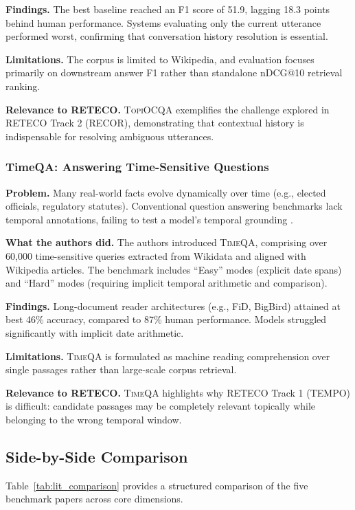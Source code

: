 \textbf{Findings.} The best baseline reached an F1 score of 51.9, lagging 18.3 points behind human performance. Systems evaluating only the current utterance performed worst, confirming that conversation history resolution is essential.

\textbf{Limitations.} The corpus is limited to Wikipedia, and evaluation focuses primarily on downstream answer F1 rather than standalone nDCG@10 retrieval ranking.

\textbf{Relevance to RETECO.} \textsc{TopiOCQA} exemplifies the challenge explored in RETECO Track 2 (RECOR), demonstrating that contextual history is indispensable for resolving ambiguous utterances.

\subsubsection{TimeQA: Answering Time-Sensitive Questions}
\textbf{Problem.} Many real-world facts evolve dynamically over time (e.g., elected officials, regulatory statutes). Conventional question answering benchmarks lack temporal annotations, failing to test a model's temporal grounding \cite{timeqa}.

\textbf{What the authors did.} The authors introduced \textsc{TimeQA}, comprising over 60,000 time-sensitive queries extracted from Wikidata and aligned with Wikipedia articles. The benchmark includes ``Easy'' modes (explicit date spans) and ``Hard'' modes (requiring implicit temporal arithmetic and comparison).

\textbf{Findings.} Long-document reader architectures (e.g., FiD, BigBird) attained at best 46\% accuracy, compared to 87\% human performance. Models struggled significantly with implicit date arithmetic.

\textbf{Limitations.} \textsc{TimeQA} is formulated as machine reading comprehension over single passages rather than large-scale corpus retrieval.

\textbf{Relevance to RETECO.} \textsc{TimeQA} highlights why RETECO Track 1 (TEMPO) is difficult: candidate passages may be completely relevant topically while belonging to the wrong temporal window.

\subsection{Side-by-Side Comparison}

Table~\ref{tab:lit_comparison} provides a structured comparison of the five benchmark papers across core dimensions.

